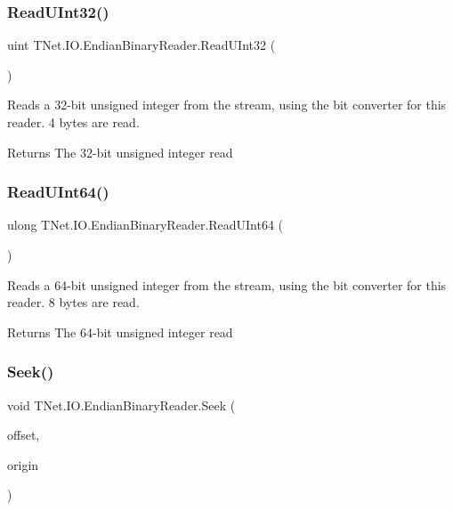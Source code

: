 \subsubsection{\texorpdfstring{Read\+U\+Int32()}{ReadUInt32()}}
{\footnotesize\ttfamily uint T\+Net.\+I\+O.\+Endian\+Binary\+Reader.\+Read\+U\+Int32 (\begin{DoxyParamCaption}{ }\end{DoxyParamCaption})}



Reads a 32-\/bit unsigned integer from the stream, using the bit converter for this reader. 4 bytes are read. 

\begin{DoxyReturn}{Returns}
The 32-\/bit unsigned integer read
\end{DoxyReturn}
\mbox{\label{class_t_net_1_1_i_o_1_1_endian_binary_reader_a1099cd78f47f8d191142cf344f8c12cb}} 
\subsubsection{\texorpdfstring{Read\+U\+Int64()}{ReadUInt64()}}
{\footnotesize\ttfamily ulong T\+Net.\+I\+O.\+Endian\+Binary\+Reader.\+Read\+U\+Int64 (\begin{DoxyParamCaption}{ }\end{DoxyParamCaption})}



Reads a 64-\/bit unsigned integer from the stream, using the bit converter for this reader. 8 bytes are read. 

\begin{DoxyReturn}{Returns}
The 64-\/bit unsigned integer read
\end{DoxyReturn}
\mbox{\label{class_t_net_1_1_i_o_1_1_endian_binary_reader_a3820798fc511f4ecedd0407461ffb359}} 
\subsubsection{\texorpdfstring{Seek()}{Seek()}}
{\footnotesize\ttfamily void T\+Net.\+I\+O.\+Endian\+Binary\+Reader.\+Seek (\begin{DoxyParamCaption}\item[{int}]{offset,  }\item[{Seek\+Origin}]{origin }\end{DoxyParamCaption})}



